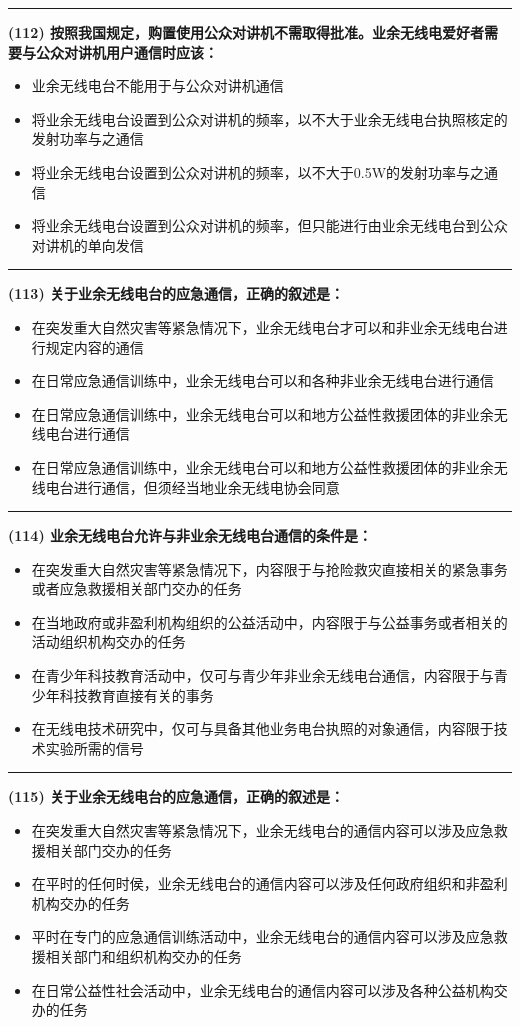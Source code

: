 \documentclass[twocolumn]{ctexart}  %
\begin{document}
\noindent\rule{0.5\textwidth}{1pt}
\heiti \textbf{(112) 按照我国规定，购置使用公众对讲机不需取得批准。业余无线电爱好者需要与公众对讲机用户通信时应该：} \songti {\color{gray} [LK1010] }
\begin{itemize}
	\item  业余无线电台不能用于与公众对讲机通信
	\item  将业余无线电台设置到公众对讲机的频率，以不大于业余无线电台执照核定的发射功率与之通信
	\item  将业余无线电台设置到公众对讲机的频率，以不大于0.5W的发射功率与之通信
	\item  将业余无线电台设置到公众对讲机的频率，但只能进行由业余无线电台到公众对讲机的单向发信
\end{itemize}


\noindent\rule{0.5\textwidth}{1pt}
\heiti \textbf{(113) 关于业余无线电台的应急通信，正确的叙述是：} \songti {\color{gray} [LK0053] }
\begin{itemize}
	\item  在突发重大自然灾害等紧急情况下，业余无线电台才可以和非业余无线电台进行规定内容的通信
	\item  在日常应急通信训练中，业余无线电台可以和各种非业余无线电台进行通信
	\item  在日常应急通信训练中，业余无线电台可以和地方公益性救援团体的非业余无线电台进行通信
	\item  在日常应急通信训练中，业余无线电台可以和地方公益性救援团体的非业余无线电台进行通信，但须经当地业余无线电协会同意
\end{itemize}


\noindent\rule{0.5\textwidth}{1pt}
\heiti \textbf{(114) 业余无线电台允许与非业余无线电台通信的条件是：} \songti {\color{gray} [LK0054] }
\begin{itemize}
	\item  在突发重大自然灾害等紧急情况下，内容限于与抢险救灾直接相关的紧急事务或者应急救援相关部门交办的任务
	\item  在当地政府或非盈利机构组织的公益活动中，内容限于与公益事务或者相关的活动组织机构交办的任务
	\item  在青少年科技教育活动中，仅可与青少年非业余无线电台通信，内容限于与青少年科技教育直接有关的事务
	\item  在无线电技术研究中，仅可与具备其他业务电台执照的对象通信，内容限于技术实验所需的信号
\end{itemize}


\noindent\rule{0.5\textwidth}{1pt}
\heiti \textbf{(115) 关于业余无线电台的应急通信，正确的叙述是：} \songti {\color{gray} [LK0055] }
\begin{itemize}
	\item  在突发重大自然灾害等紧急情况下，业余无线电台的通信内容可以涉及应急救援相关部门交办的任务
	\item  在平时的任何时侯，业余无线电台的通信内容可以涉及任何政府组织和非盈利机构交办的任务
	\item  平时在专门的应急通信训练活动中，业余无线电台的通信内容可以涉及应急救援相关部门和组织机构交办的任务
	\item  在日常公益性社会活动中，业余无线电台的通信内容可以涉及各种公益机构交办的任务
\end{itemize}
\end{document}
